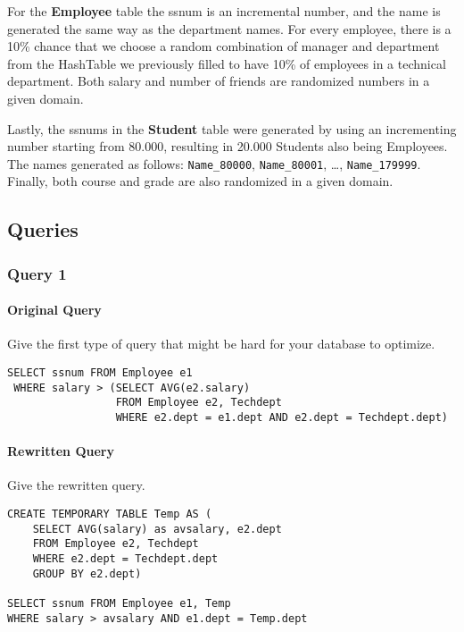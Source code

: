 \documentclass[11pt]{scrartcl}
\begin{document}
    For the \textbf{Employee} table the ssnum is an incremental number, and the name is generated the same way as the department names.
    For every employee, there is a 10\% chance that we choose a random combination of manager and department from the HashTable we previously filled to have 10\% of employees in a technical department.
    Both salary and number of friends are randomized numbers in a given domain.

    Lastly, the ssnums in the \textbf{Student} table were generated by using an incrementing number starting from 80.000, resulting in 20.000 Students also being Employees.
    The names generated as follows: \texttt{Name\_80000}, \texttt{Name\_80001}, \dots , \texttt{Name\_179999}.
    Finally, both course and grade are also randomized in a given domain.
    
    \subsection*{Queries}

    \subsubsection*{Query 1}

    \paragraph{Original Query}

    Give the first type of query that might be hard for your database to optimize.

    \begin{lstlisting}[style=dbtsql]
 SELECT ssnum FROM Employee e1 
 WHERE salary > (SELECT AVG(e2.salary) 
                 FROM Employee e2, Techdept 
                 WHERE e2.dept = e1.dept AND e2.dept = Techdept.dept)
    \end{lstlisting}

    \paragraph{Rewritten Query}

    Give the rewritten query.

    \begin{lstlisting}[style=dbtsql]
CREATE TEMPORARY TABLE Temp AS (
    SELECT AVG(salary) as avsalary, e2.dept 
    FROM Employee e2, Techdept 
    WHERE e2.dept = Techdept.dept 
    GROUP BY e2.dept)

SELECT ssnum FROM Employee e1, Temp 
WHERE salary > avsalary AND e1.dept = Temp.dept
    \end{lstlisting}
\end{document}
